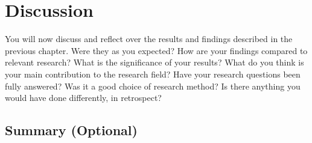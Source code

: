 \chapter{Discussion}
\label{chap:discussion} 

You will now discuss and reflect over the results and findings described in the previous chapter. Were they as you expected? How are your findings compared to relevant research? What is the significance of your results? What do you think is your main contribution to the research field? Have your research questions been fully answered? Was it a good choice of research method? Is there anything you would have done differently, in retrospect?

\section{Summary (Optional)}

\lipsum[62-73]





